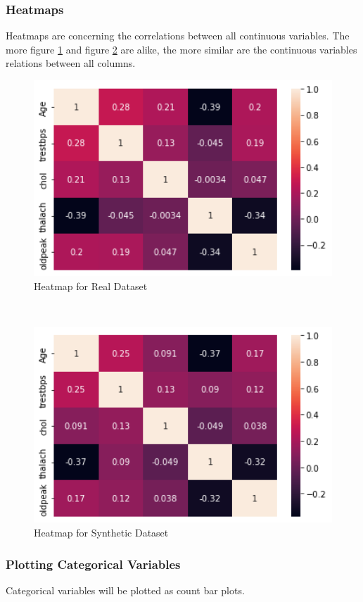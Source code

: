 \documentclass{article}
\begin{document}
\subsubsection{Heatmaps}
Heatmaps are concerning the correlations between all continuous variables. The more figure \ref{fig:heatmapreal} and figure \ref{fig:heatmapsynth} are alike, the more similar are the continuous variables relations between all columns. 

\begin{figure}[h!]
\centering
\includegraphics[width=120mm]{heatmap_real}
\caption{Heatmap for Real  Dataset}
\label{fig:heatmapreal}
\end{figure}
\\

\begin{figure}[h!]
\centering
\includegraphics[width=120mm]{heatmap_synth}
\caption{Heatmap for Synthetic Dataset}
\label{fig:heatmapsynth}
\end{figure}

\subsubsection{Plotting Categorical Variables}
Categorical variables will be plotted as count bar plots.
\end{document}

